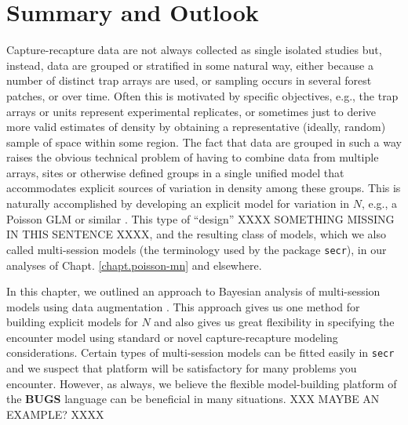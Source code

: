 \section{Summary and Outlook}

Capture-recapture data are not always 
collected as single isolated
studies but, instead, data are grouped or stratified in some natural
way, either because a number of distinct trap arrays are used, or
sampling occurs in several forest patches, or over time. Often this is
motivated by specific objectives, e.g., the trap arrays or units
represent experimental replicates, or sometimes just to derive more
valid estimates of density by obtaining a representative (ideally,
random) sample of space within some region.  The fact that data are
grouped in such a way raises the obvious technical problem of having
to combine data from multiple arrays, sites or otherwise defined groups in a single unified
model that accommodates explicit sources of variation in density among
these groups.  This is naturally accomplished by developing an explicit model
for variation in $N$, e.g., a Poisson GLM or similar
\citep{converse_royle:2012, royle_etal:2012arXiv}. This type of ``design'' XXXX SOMETHING MISSING IN THIS SENTENCE XXXX, and
the resulting class of models, which we also called multi-session
models (the terminology used by
the package \mbox{\tt secr}), in our analyses of
Chapt. \ref{chapt.poisson-mn} and elsewhere.

In this chapter, we outlined an approach to Bayesian analysis of
multi-session models using data augmentation
\citet{converse_royle:2012, royle_converse:2013}.  This
approach gives us one method for building explicit models for $N$
and also gives us
great flexibility in specifying the encounter model using standard or
novel capture-recapture modeling considerations. Certain types of
multi-session models can be fitted easily in \mbox{\tt secr} and we
suspect that platform will be satisfactory for many problems you
encounter. However, as always, we believe the flexible model-building
platform of the {\bf BUGS} language can be beneficial in many
situations. XXX MAYBE AN EXAMPLE? XXXX

